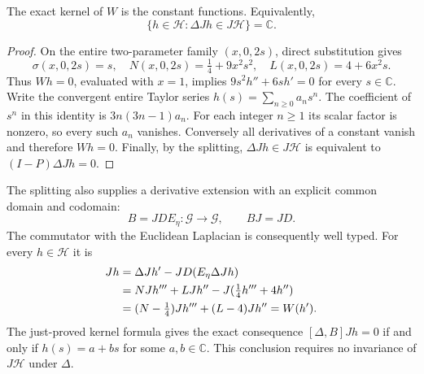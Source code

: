 \begin{cqproposition}
The exact kernel of $W$ is the constant functions. Equivalently,
\[
 \{h\in\mathscr H:\Delta Jh\in J\mathscr H\}=\mathbb C.
\]
\end{cqproposition}
\begin{proof}
On the entire two-parameter family $(x,0,2s)$, direct substitution gives
\[
 \sigma(x,0,2s)=s,\quad
 N(x,0,2s)=\tfrac14+9x^2s^2,\quad
 L(x,0,2s)=4+6x^2s .
\]
Thus $Wh=0$, evaluated with $x=1$, implies
$9s^2h''+6sh'=0$ for every $s\in\mathbb C$.
Write the convergent entire Taylor series $h(s)=\sum_{n\ge0}a_ns^n$.
The coefficient of $s^n$ in this identity is $3n(3n-1)a_n$.
For each integer $n\ge1$ its scalar factor is nonzero, so every such
$a_n$ vanishes. Conversely all derivatives of a constant vanish and
therefore $Wh=0$. Finally, by the splitting,
$\Delta Jh\in J\mathscr H$ is equivalent to $(I-P)\Delta Jh=0$.
\end{proof}

The splitting also supplies a derivative extension with an explicit
common domain and codomain:
\[
 B=JDE_\eta:\mathscr G\longrightarrow\mathscr G,\qquad BJ=JD .
\]
The commutator with the Euclidean Laplacian is consequently well typed.
For every $h\in\mathscr H$ it is
\begin{align}
 [\Delta,B]Jh
 &=\Delta Jh'-JD(E_\eta\Delta Jh)\notag\\
 &=NJh'''+LJh''-J(\tfrac14h'''+4h'')\notag\\
 &=(N-\tfrac14)Jh'''+(L-4)Jh''=W(h').
 \label{eq:cq-spatial-commutator}
\end{align}
The just-proved kernel formula gives the exact consequence
$[\Delta,B]Jh=0$ if and only if $h(s)=a+bs$ for some $a,b\in\mathbb C$.
This conclusion requires no invariance of $J\mathscr H$ under $\Delta$.

